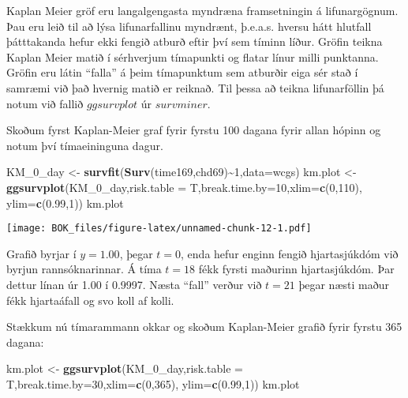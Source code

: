 \documentclass[
]{book}
\newenvironment{Shaded}{\begin{snugshade}}{\end{snugshade}}
\newcommand{\DataTypeTok}[1]{\textcolor[rgb]{0.13,0.29,0.53}{#1}}
\newcommand{\DecValTok}[1]{\textcolor[rgb]{0.00,0.00,0.81}{#1}}
\newcommand{\FloatTok}[1]{\textcolor[rgb]{0.00,0.00,0.81}{#1}}
\newcommand{\KeywordTok}[1]{\textcolor[rgb]{0.13,0.29,0.53}{\textbf{#1}}}
\newcommand{\NormalTok}[1]{#1}
\newcommand{\OperatorTok}[1]{\textcolor[rgb]{0.81,0.36,0.00}{\textbf{#1}}}
\newcommand{\StringTok}[1]{\textcolor[rgb]{0.31,0.60,0.02}{#1}}
\begin{document}
Kaplan Meier gröf eru langalgengasta myndræna framsetningin á lifunargögnum. Þau eru leið til að lýsa lifunarfallinu myndrænt, þ.e.a.s. hversu hátt hlutfall þátttakanda hefur ekki fengið atburð eftir því sem tíminn líður. Gröfin teikna Kaplan Meier matið í sérhverjum tímapunkti og flatar línur milli punktanna. Gröfin eru látin ``falla'' á þeim tímapunktum sem atburðir eiga sér stað í samræmi við það hvernig matið er reiknað. Til þessa að teikna lifunarföllin þá notum við fallið \(ggsurvplot\) úr \(survminer\).

Skoðum fyrst Kaplan-Meier graf fyrir fyrstu 100 dagana fyrir allan hópinn og notum því tímaeininguna dagur.

\begin{Shaded}
\begin{Highlighting}[]
\NormalTok{KM\_}\DecValTok{0}\NormalTok{\_day <{-}}\StringTok{ }\KeywordTok{survfit}\NormalTok{(}\KeywordTok{Surv}\NormalTok{(time169,chd69)}\OperatorTok{\textasciitilde{}}\DecValTok{1}\NormalTok{,}\DataTypeTok{data=}\NormalTok{wcgs)}
\NormalTok{km.plot <{-}}\StringTok{ }\KeywordTok{ggsurvplot}\NormalTok{(KM\_}\DecValTok{0}\NormalTok{\_day,}\DataTypeTok{risk.table =}\NormalTok{ T,}\DataTypeTok{break.time.by=}\DecValTok{10}\NormalTok{,}\DataTypeTok{xlim=}\KeywordTok{c}\NormalTok{(}\DecValTok{0}\NormalTok{,}\DecValTok{110}\NormalTok{),}
                      \DataTypeTok{ylim=}\KeywordTok{c}\NormalTok{(}\FloatTok{0.99}\NormalTok{,}\DecValTok{1}\NormalTok{)) }
\NormalTok{km.plot }
\end{Highlighting}
\end{Shaded}

\texttt{[image: BOK\_files/figure-latex/unnamed-chunk-12-1.pdf]}

Grafið byrjar í \(y=1.00\), þegar \(t=0\), enda hefur enginn fengið hjartasjúkdóm við byrjun rannsóknarinnar. Á tíma \(t=18\) fékk fyrsti maðurinn hjartasjúkdóm. Þar dettur línan úr 1.00 í 0.9997. Næsta ``fall'' verður við \(t=21\) þegar næsti maður fékk hjartaáfall og svo koll af kolli.

Stækkum nú tímarammann okkar og skoðum Kaplan-Meier grafið fyrir fyrstu 365 dagana:

\begin{Shaded}
\begin{Highlighting}[]
\NormalTok{km.plot <{-}}\StringTok{ }\KeywordTok{ggsurvplot}\NormalTok{(KM\_}\DecValTok{0}\NormalTok{\_day,}\DataTypeTok{risk.table =}\NormalTok{ T,}\DataTypeTok{break.time.by=}\DecValTok{30}\NormalTok{,}\DataTypeTok{xlim=}\KeywordTok{c}\NormalTok{(}\DecValTok{0}\NormalTok{,}\DecValTok{365}\NormalTok{),}
                      \DataTypeTok{ylim=}\KeywordTok{c}\NormalTok{(}\FloatTok{0.99}\NormalTok{,}\DecValTok{1}\NormalTok{)) }
\NormalTok{km.plot }
\end{Highlighting}
\end{Shaded}
\end{document}

